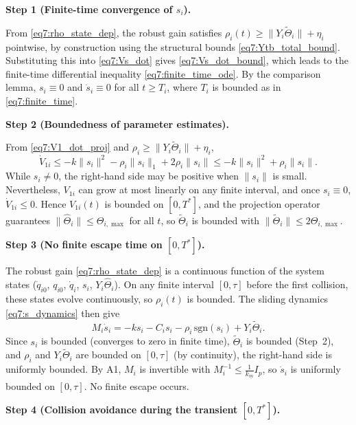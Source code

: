 \medskip\noindent\textbf{Step 1 (Finite-time convergence of $s_i$).}

From \eqref{eq7:rho_state_dep}, the robust gain satisfies
$\rho_i(t) \ge \|Y_i\tilde{\Theta}_i\| + \eta_i$ pointwise, by construction using the
structural bounds \eqref{eq7:Ytb_total_bound}.  Substituting this into \eqref{eq7:Vs_dot}
gives \eqref{eq7:Vs_dot_bound}, which leads to the finite-time differential inequality
\eqref{eq7:finite_time_ode}.  By the comparison lemma, $s_i \equiv 0$ and $\dot{s}_i \equiv 0$
for all $t \ge T_i$, where $T_i$ is bounded as in \eqref{eq7:finite_time}.

\medskip\noindent\textbf{Step 2 (Boundedness of parameter estimates).}

From \eqref{eq7:V1_dot_proj} and $\rho_i \ge \|Y_i\tilde{\Theta}_i\| + \eta_i$,
\begin{equation}
	\dot{V}_{1i} \le -k\|s_i\|^2 - \rho_i\|s_i\|_1 + 2\rho_i\|s_i\|
	\le -k\|s_i\|^2 + \rho_i\|s_i\|.
\end{equation}
While $s_i \neq 0$, the right-hand side may be positive when $\|s_i\|$ is small.
Nevertheless, $V_{1i}$ can grow at most linearly on any finite interval, and once $s_i \equiv 0$,
$\dot{V}_{1i} \le 0$.  Hence $V_{1i}(t)$ is bounded on $[0,T^*]$, and the projection operator
guarantees $\|\hat{\Theta}_i\| \le \Theta_{i,\max}$ for all $t$, so $\tilde{\Theta}_i$ is
bounded with $\|\tilde{\Theta}_i\| \le 2\Theta_{i,\max}$.

\medskip\noindent\textbf{Step 3 (No finite escape time on $[0,T^*]$).}

The robust gain \eqref{eq7:rho_state_dep} is a continuous function of the system states
($\dot{q}_{i0}$, $q_{i0}$, $\dot{q}_i$, $s_i$, $Y_i\hat{\Theta}_i$).  On any finite interval
$[0,\tau]$ before the first collision, these states evolve continuously, so $\rho_i(t)$ is
bounded.  The sliding dynamics \eqref{eq7:s_dynamics} then give
\begin{equation}
	M_i\dot{s}_i = -k s_i - C_i s_i - \rho_i\,\mathrm{sgn}(s_i) + Y_i\tilde{\Theta}_i.
\end{equation}
Since $s_i$ is bounded (converges to zero in finite time), $\tilde{\Theta}_i$ is bounded
(Step~2), and $\rho_i$ and $Y_i\tilde{\Theta}_i$ are bounded on $[0,\tau]$ (by continuity),
the right-hand side is uniformly bounded.  By A1, $M_i$ is invertible with
$M_i^{-1} \le \frac{1}{k_{\underline m}}I_p$, so $\dot{s}_i$ is uniformly bounded on
$[0,\tau]$.  No finite escape occurs.

\medskip\noindent\textbf{Step 4 (Collision avoidance during the transient $[0,T^*]$).}


